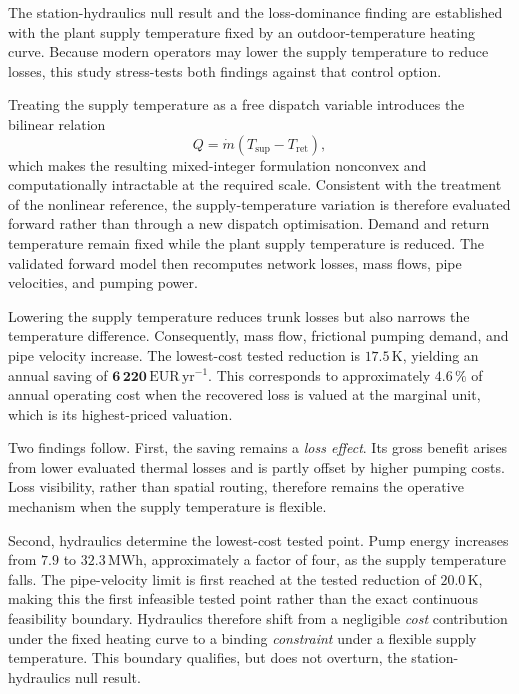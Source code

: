 \documentclass[a4paper,fleqn]{cas-sc}
\begin{document}
The station-hydraulics null result and the loss-dominance finding are established
with the plant supply temperature fixed by an outdoor-temperature heating curve.
Because modern operators may lower the supply temperature to reduce losses, this
study stress-tests both findings against that control option.

Treating the supply temperature as a free dispatch variable introduces the
bilinear relation
\[
    Q = \dot{m}\left(T_{\mathrm{sup}} - T_{\mathrm{ret}}\right),
\]
which makes the resulting mixed-integer formulation nonconvex and computationally
intractable at the required scale. Consistent with the treatment of the nonlinear
reference, the supply-temperature variation is therefore evaluated forward rather
than through a new dispatch optimisation. Demand and return temperature remain
fixed while the plant supply temperature is reduced. The validated forward model
then recomputes network losses, mass flows, pipe velocities, and pumping power.

Lowering the supply temperature reduces trunk losses but also narrows the
temperature difference. Consequently, mass flow, frictional pumping demand, and
pipe velocity increase. The lowest-cost tested reduction is
\(\mathbf{17.5}\,\mathrm{K}\), yielding an annual saving of
\(\mathbf{6\,220}\,\mathrm{EUR}\,\mathrm{yr}^{-1}\). This corresponds to
approximately \(\mathbf{4.6}\,\%\) of annual operating cost when the recovered
loss is valued at the marginal unit, which is its highest-priced valuation.

Two findings follow. First, the saving remains a \emph{loss effect}. Its gross
benefit arises from lower evaluated thermal losses and is partly offset by higher
pumping costs. Loss visibility, rather than spatial routing, therefore remains the
operative mechanism when the supply temperature is flexible.

Second, hydraulics determine the lowest-cost tested point. Pump energy increases
from \(\mathbf{7.9}\) to \(\mathbf{32.3}\,\mathrm{MWh}\), approximately a factor
of four, as the supply temperature falls. The pipe-velocity limit is first reached
at the tested reduction of \(\mathbf{20.0}\,\mathrm{K}\), making this the first
infeasible tested point rather than the exact continuous feasibility boundary.
Hydraulics therefore shift from a negligible \emph{cost} contribution under the
fixed heating curve to a binding \emph{constraint} under a flexible supply
temperature. This boundary qualifies, but does not overturn, the
station-hydraulics null result.

\end{document}
